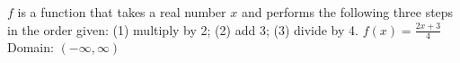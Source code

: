 {$f$ is a function that takes a real number $x$ and performs the following three steps in the order given: (1) multiply by 2; (2) add 3; (3) divide by 4.}
{ $f(x) = \frac{2x+3}{4}$ \\  Domain:  $(-\infty, \infty)$ }